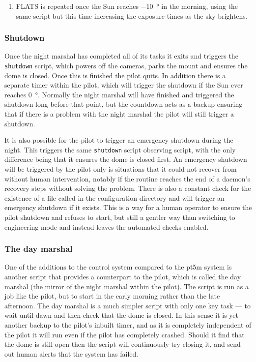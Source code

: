 \begin{colsection}
\begin{colsection}
\begin{enumerate}
\item FLATS is repeated once the Sun reaches \SI{-10}{\degree} in the morning, using the same script but this time increasing the exposure times as the sky brightens.

\end{enumerate}

\subsubsection{Shutdown}

Once the night marshal has completed all of its tasks it exits and triggers the \texttt{shutdown} script, which powers off the cameras, parks the mount and ensures the dome is closed. Once this is finished the pilot quits. In addition there is a separate  timer within the pilot, which will trigger the shutdown if the Sun ever reaches \SI{0}{\degree}. Normally the night marshal will have finished and triggered the shutdown long before that point, but the countdown acts as a backup ensuring that if there is a problem with the night marshal the pilot will still trigger a shutdown.

It is also possible for the pilot to trigger an emergency shutdown during the night. This triggers the same \texttt{shutdown} script observing script, with the only difference being that it ensures the dome is closed first. An emergency shutdown will be triggered by the pilot only is situations that it could not recover from without human intervention, notably if the  routine reaches the end of a daemon's recovery steps without solving the problem. There is also a constant check for the existence of a file called  in the configuration directory and will trigger an emergency shutdown if it exists. This is a way for a human operator to ensure the pilot shutdown and refuses to start, but still a gentler way than switching to engineering mode and instead leaves the automated checks enabled.

\subsubsection{The day marshal}

One of the additions to the control system compared to the \gls{pt5m} system is another script that provides a counterpart to the pilot, which is called the day marshal (the mirror of the night marshal within the pilot). The  script is run as a  job like the pilot, but to start in the early morning rather than the late afternoon. The day marshal is a much simpler script with only one key task --- to wait until dawn and then check that the dome is closed. In this sense it is yet another backup to the pilot's inbuilt  timer, and as it is completely independent of the pilot it will run even if the pilot has completely crashed. Should it find that the dome is still open then the script will continuously try closing it, and send out human alerts that the system has failed.


\end{colsection}
\end{colsection}

